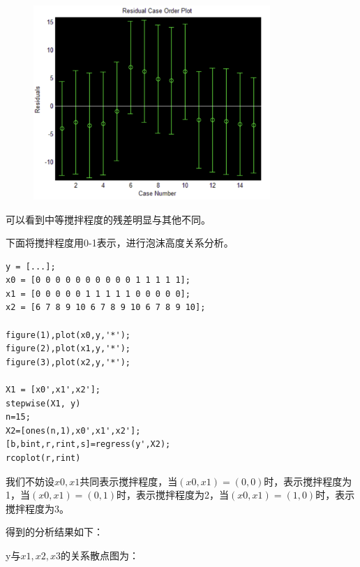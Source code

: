 \documentclass{article}
\begin{document}
\begin{figure}[H]
    \centering
    \includegraphics[width=0.8\textwidth]{pic14.png}
\end{figure}

可以看到中等搅拌程度的残差明显与其他不同。

下面将搅拌程度用0-1表示，进行泡沫高度关系分析。

\begin{lstlisting}
y = [...];
x0 = [0 0 0 0 0 0 0 0 0 0 1 1 1 1 1];
x1 = [0 0 0 0 0 1 1 1 1 1 0 0 0 0 0];
x2 = [6 7 8 9 10 6 7 8 9 10 6 7 8 9 10];

figure(1),plot(x0,y,'*');
figure(2),plot(x1,y,'*');
figure(3),plot(x2,y,'*');

X1 = [x0',x1',x2'];
stepwise(X1, y)
n=15;
X2=[ones(n,1),x0',x1',x2'];
[b,bint,r,rint,s]=regress(y',X2);
rcoplot(r,rint)

\end{lstlisting}

我们不妨设$x0,x1$共同表示搅拌程度，当$(x0,x1)=(0,0)$时，表示搅拌程度为1，当$(x0,x1)=(0,1)$时，表示搅拌程度为2，当$(x0,x1)=(1,0)$时，表示搅拌程度为3。

得到的分析结果如下：

y与$x1,x2,x3$的关系散点图为：
\end{document}
